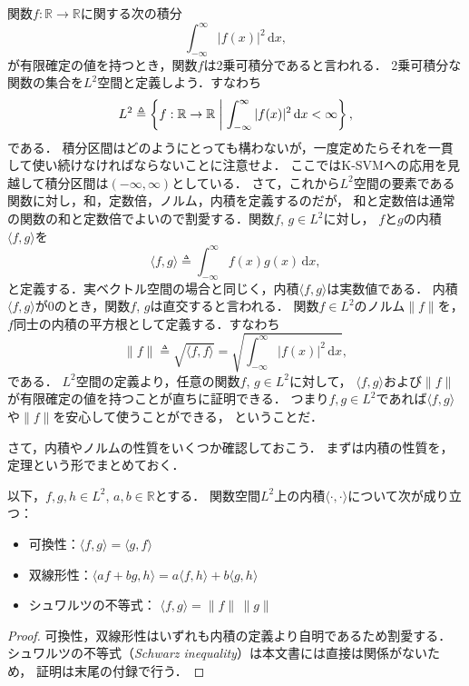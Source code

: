 関数$f : \mathbb{R} \to \mathbb{R}$に関する次の積分
\begin{equation}
\int_{-\infty}^{\infty} |f(x)|^2 \, \mathrm{d}x,
\end{equation}
が有限確定の値を持つとき，関数$f$は2乗可積分であると言われる．
2乗可積分な関数の集合を$L^2$空間と定義しよう．すなわち
\begin{equation}
L^2 \triangleq
\left\{ f : \mathbb{R} \to \mathbb{R} \biggm| \int_{-\infty}^{\infty} |f(x)|^2 \, \mathrm{d}x < \infty \right\},
\end{equation}
である．
積分区間はどのようにとっても構わないが，一度定めたらそれを一貫して使い続けなければならないことに注意せよ．
ここではK-SVMへの応用を見越して積分区間は$(-\infty, \infty)$としている．
さて，これから$L^2$空間の要素である関数に対し，和，定数倍，ノルム，内積を定義するのだが，
和と定数倍は通常の関数の和と定数倍でよいので割愛する．関数$f$, $g \in L^2$に対し，
$f$と$g$の内積$\langle f, g \rangle$を
\begin{equation}
\langle f, g \rangle \triangleq \int_{-\infty}^{\infty} f(x) g(x) \, \mathrm{d}x,
\end{equation}
と定義する．実ベクトル空間の場合と同じく，内積$\langle f, g \rangle$は実数値である．
内積$\langle f, g \rangle$が0のとき，関数$f$, $g$は直交すると言われる．
関数$f \in L^2$のノルム$\| f \|$を，$f$同士の内積の平方根として定義する．すなわち
\begin{equation}
\| f \| \triangleq \sqrt{\langle f, f \rangle}
= \sqrt{\int_{-\infty}^{\infty} |f(x)|^2 \, \mathrm{d}x},
\end{equation}
である．
$L^2$空間の定義より，任意の関数$f$, $g \in L^2$に対して，
$\langle f, g \rangle$および$\| f \|$が有限確定の値を持つことが直ちに証明できる．
つまり$f, g \in L^2$であれば$\langle f, g \rangle$や$\| f \|$を安心して使うことができる，
ということだ．

さて，内積やノルムの性質をいくつか確認しておこう．
まずは内積の性質を，定理という形でまとめておく．

\begin{theorem}
以下，$f, g, h \in L^2$, $a, b \in \mathbb{R}$とする．
関数空間$L^2$上の内積$\langle \cdot, \cdot \rangle$について次が成り立つ：
\begin{itemize}
    \item 可換性：$\langle f, g \rangle = \langle g, f \rangle$
    \item 双線形性：$\langle a f + b g, h \rangle = a \langle f, h \rangle + b \langle g, h \rangle$
    \item シュワルツの不等式： $\langle f, g \rangle = \| f \| \, \| g \|$
\end{itemize}
\end{theorem}
\begin{proof}
可換性，双線形性はいずれも内積の定義より自明であるため割愛する．
シュワルツの不等式（\textit{Schwarz inequality}）は本文書には直接は関係がないため，
証明は末尾の付録で行う．
\end{proof}


